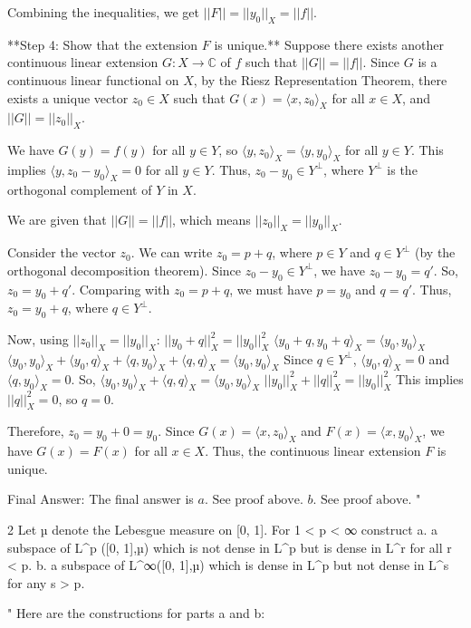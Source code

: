 Combining the inequalities, we get $||F|| = ||y_0||_X = ||f||$.

**Step 4: Show that the extension $F$ is unique.**
Suppose there exists another continuous linear extension $G: X \to \mathbb{C}$ of $f$ such that $||G|| = ||f||$.
Since $G$ is a continuous linear functional on $X$, by the Riesz Representation Theorem, there exists a unique vector $z_0 \in X$ such that $G(x) = \langle x, z_0 \rangle_X$ for all $x \in X$, and $||G|| = ||z_0||_X$.

We have $G(y) = f(y)$ for all $y \in Y$, so $\langle y, z_0 \rangle_X = \langle y, y_0 \rangle_X$ for all $y \in Y$.
This implies $\langle y, z_0 - y_0 \rangle_X = 0$ for all $y \in Y$.
Thus, $z_0 - y_0 \in Y^\perp$, where $Y^\perp$ is the orthogonal complement of $Y$ in $X$.

We are given that $||G|| = ||f||$, which means $||z_0||_X = ||y_0||_X$.

Consider the vector $z_0$. We can write $z_0 = p + q$, where $p \in Y$ and $q \in Y^\perp$ (by the orthogonal decomposition theorem).
Since $z_0 - y_0 \in Y^\perp$, we have $z_0 - y_0 = q'$.
So, $z_0 = y_0 + q'$. Comparing with $z_0 = p + q$, we must have $p = y_0$ and $q = q'$.
Thus, $z_0 = y_0 + q$, where $q \in Y^\perp$.

Now, using $||z_0||_X = ||y_0||_X$:
$||y_0 + q||_X^2 = ||y_0||_X^2$
$\langle y_0 + q, y_0 + q \rangle_X = \langle y_0, y_0 \rangle_X$
$\langle y_0, y_0 \rangle_X + \langle y_0, q \rangle_X + \langle q, y_0 \rangle_X + \langle q, q \rangle_X = \langle y_0, y_0 \rangle_X$
Since $q \in Y^\perp$, $\langle y_0, q \rangle_X = 0$ and $\langle q, y_0 \rangle_X = 0$.
So, $\langle y_0, y_0 \rangle_X + \langle q, q \rangle_X = \langle y_0, y_0 \rangle_X$
$||y_0||_X^2 + ||q||_X^2 = ||y_0||_X^2$
This implies $||q||_X^2 = 0$, so $q = 0$.

Therefore, $z_0 = y_0 + 0 = y_0$.
Since $G(x) = \langle x, z_0 \rangle_X$ and $F(x) = \langle x, y_0 \rangle_X$, we have $G(x) = F(x)$ for all $x \in X$.
Thus, the continuous linear extension $F$ is unique.

Final Answer: The final answer is $\boxed{a. \text{ See proof above. } b. \text{ See proof above.}}$
"

2 Let µ denote the Lebesgue measure on [0, 1]. For 1 < p < ∞ construct
a. a subspace of L^p ([0, 1],µ) which is not dense in L^p but is dense in L^r for all r < p.
b. a subspace of L^∞([0, 1],µ) which is dense in L^p but not dense in L^s for any s > p.

"
Here are the constructions for parts a and b:

